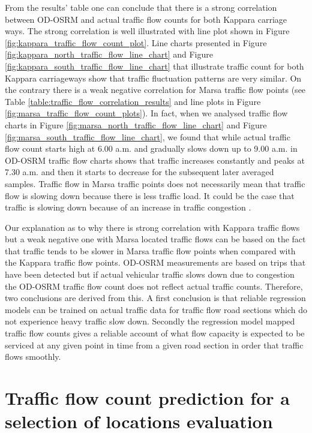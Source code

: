 \documentclass[12pt, a4paper]{report}
\theoremstyle{definition}
\theoremstyle{definition}%
\theoremstyle{definition}%
\theoremstyle{definition}%
\theoremstyle{definition}%
\theoremstyle{definition}%
\begin{document}
From the results' table one can conclude that there is a strong correlation between OD-OSRM and actual traffic flow counts for both Kappara carriage ways. The strong correlation is well illustrated with line plot shown in Figure \ref{fig:kappara_traffic_flow_count_plot}. Line charts presented in Figure \ref{fig:kappara_north_traffic_flow_line_chart} and Figure \ref{fig:kappara_south_traffic_flow_line_chart} that illustrate traffic count for both Kappara carriageways show that traffic fluctuation patterns are very similar. On the contrary there is a weak negative correlation for Marsa traffic flow points (see Table \ref{table:traffic_flow_correlation_results} and line plots in Figure \ref{fig:marsa_traffic_flow_count_plots}). In fact, when we analysed traffic flow charts in Figure \ref{fig:marsa_north_traffic_flow_line_chart} and Figure \ref{fig:marsa_south_traffic_flow_line_chart},  we found that while actual traffic flow count starts high at 6.00 a.m. and gradually slows down up to 9.00 a.m. in OD-OSRM traffic flow charts shows that traffic increases constantly and peaks at 7.30 a.m. and then it starts to decrease for the subsequent later averaged samples. Traffic flow in Marsa traffic points does not necessarily mean that traffic flow is slowing down because there is less traffic load. It could be the case that traffic is slowing down because of an increase in traffic congestion \cite{Pace2017}.

Our explanation as to why there is strong correlation with Kappara traffic flows but a weak negative one with Marsa located traffic flows can be based on the fact that traffic tends to be slower in Marsa traffic flow points when compared with the Kappara traffic flow points. OD-OSRM measurements are based on trips that have been detected but if actual vehicular traffic slows down due to congestion the OD-OSRM traffic flow count does not reflect actual traffic counts. Therefore, two conclusions are derived from this. A first conclusion is that reliable regression models can be trained on actual traffic data for traffic flow road sections which do not experience heavy traffic slow down.  Secondly the regression model mapped traffic flow counts gives a reliable account of what flow capacity is expected to be serviced at any given point in time from a given road section in order that traffic flows smoothly. 

\section{Traffic flow count prediction for a selection of locations evaluation}
\end{document}
